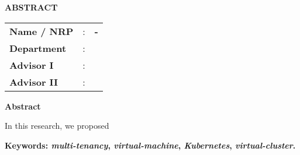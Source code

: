 \begin{center}
  \large\textbf{ABSTRACT}
\end{center}


\vspace{2ex}

\begin{center}
  \large\textbf{\engtatitle{}}
\end{center}

\vspace{2ex}

\begingroup
\setlength{\tabcolsep}{0pt}

\noindent
\begin{tabularx}{\textwidth}{l >{\centering}m{3em} X}
  \textbf{Name / NRP}   & : & \textbf{\name{} - \nrp{}} \\
  \textbf{Department}   & : & \textbf{\engdepartment{}} \\
  \textbf{Advisor I}   & : & \textbf{\advisor{}}       \\
  \textbf{Advisor II}  & : & \textbf{\coadvisor{}}     \\
\end{tabularx}
\endgroup

\noindent
\textbf{Abstract}

In this research, we proposed \lipsum[1]

\vspace{2ex}
\noindent
\textbf{Keywords: \emph{multi-tenancy}, \emph{virtual-machine}, \emph{Kubernetes}, \emph{virtual-cluster}.}
